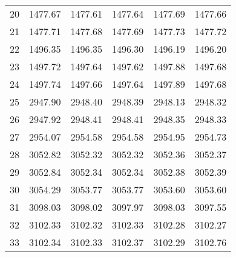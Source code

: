 \documentclass[10pt,oneside]{article}
\begin{document}
\begin{table}[h!]
\begin{tabular}{cccccc}
20 &   1477.67 & 1477.61 &    1477.64 & 1477.69 &   1477.66 \\
21 &   1477.71 & 1477.68 &    1477.69 & 1477.73 &   1477.72 \\
22 &   1496.35 & 1496.35 &    1496.30 & 1496.19 &   1496.20 \\
23 &   1497.72 & 1497.64 &    1497.62 & 1497.88 &   1497.68 \\
24 &   1497.74 & 1497.66 &    1497.64 & 1497.89 &   1497.68 \\
25 &   2947.90 & 2948.40 &    2948.39 & 2948.13 &   2948.32 \\
26 &   2947.92 & 2948.41 &    2948.41 & 2948.35 &   2948.33 \\
27 &   2954.07 & 2954.58 &    2954.58 & 2954.95 &   2954.73 \\
28 &   3052.82 & 3052.32 &    3052.32 & 3052.36 &   3052.37 \\
29 &   3052.84 & 3052.34 &    3052.34 & 3052.38 &   3052.39 \\
30 &   3054.29 & 3053.77 &    3053.77 & 3053.60 &   3053.60 \\
31 &   3098.03 & 3098.02 &    3097.97 & 3098.03 &   3097.55 \\
32 &   3102.33 & 3102.32 &    3102.33 & 3102.28 &   3102.27 \\
33 &   3102.34 & 3102.33 &    3102.37 & 3102.29 &   3102.76 \\
\bottomrule
\end{tabular}
\end{table}
\end{document}
